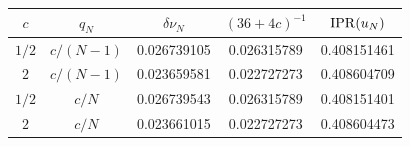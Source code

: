 \begin{tabular}{ccccc}
\toprule
$c$ & $q_N$ & $\delta\nu_N$ & $(36+4c)^{-1}$ & $\operatorname{IPR}(u_N)$\\
\midrule
$1/2$ & $c/(N-1)$ & 0.026739105 & 0.026315789 & 0.408151461 \\
$2$ & $c/(N-1)$ & 0.023659581 & 0.022727273 & 0.408604709 \\
$1/2$ & $c/N$ & 0.026739543 & 0.026315789 & 0.408151401 \\
$2$ & $c/N$ & 0.023661015 & 0.022727273 & 0.408604473 \\
\bottomrule
\end{tabular}
